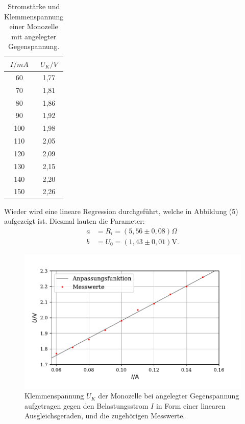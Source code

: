 \begin{table}[H]
  \centering
  \caption{Stromstärke und Klemmenspannung einer Monozelle mit angelegter Gegenspannung.}
  \begin{tabular}{c c}
    \toprule
     $I/mA$ & $U_K/V$  \\
    \midrule
    60 & 1,77\\
    70 & 1,81\\
    80 & 1,86\\
    90 & 1,92\\
    100 & 1,98\\
    110 & 2,05\\
    120 & 2,09\\
    130 & 2,15\\
    140 & 2,20\\
    150 & 2,26\\
   
  \bottomrule
  \end{tabular}
\end{table}

\noindent Wieder wird eine lineare Regression durchgeführt, welche in Abbildung (5) aufgezeigt ist. Diesmal lauten die Parameter:
\begin{align*}
a &= R_i = (5,56 \pm 0,08)\Omega \\
b &= U_0 =  (1,43 \pm 0,01)\si{\volt} .
\end{align*}

\begin{figure}[H]
  \centering
  \includegraphics{plot2.pdf}
  \caption{Klemmenspannung $U_K$ der Monozelle bei angelegter Gegenspannung aufgetragen gegen den Belastungsstrom $I$ in Form einer linearen Ausgleichsgeraden, und die zugehörigen Messwerte.}
  \label{fig:rechteck}
\end{figure}

